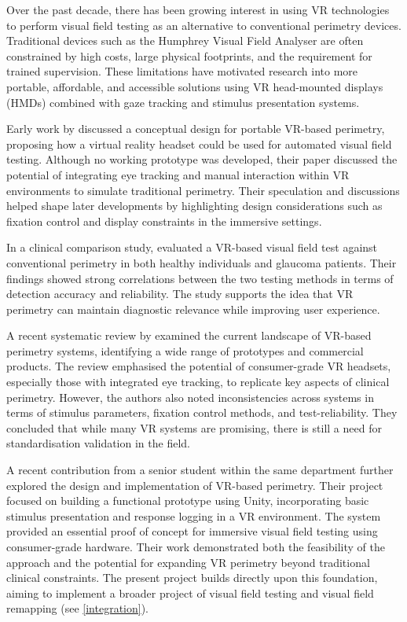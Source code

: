 \documentclass{l4proj}
\begin{document}
Over the past decade, there has been growing interest in using VR technologies to perform visual field testing as an alternative to conventional perimetry devices. Traditional devices such as the Humphrey Visual Field Analyser are often constrained by high costs, large physical footprints, and the requirement for trained supervision. These limitations have motivated research into more portable, affordable, and accessible solutions using VR head-mounted displays (HMDs) combined with gaze tracking and stimulus presentation systems.

Early work by \cite{pwork1} discussed a conceptual design for portable VR-based perimetry, proposing how a virtual reality headset could be used for automated visual field testing. Although no working prototype was developed, their paper discussed the potential of integrating eye tracking and manual interaction within VR environments to simulate traditional perimetry. Their speculation and discussions helped shape later developments by highlighting design considerations such as fixation control and display constraints in the immersive settings.

In a clinical comparison study, \cite{pwork2} evaluated a VR-based visual field test against conventional perimetry in both healthy individuals and glaucoma patients. Their findings showed strong correlations between the two testing methods in terms of detection accuracy and reliability. The study supports the idea that VR perimetry can maintain diagnostic relevance while improving user experience.

A recent systematic review by \cite{pwork3} examined the current landscape of VR-based perimetry systems, identifying a wide range of prototypes and commercial products. The review emphasised the potential of consumer-grade VR headsets, especially those with integrated eye tracking, to replicate key aspects of clinical perimetry. However, the authors also noted inconsistencies across systems in terms of stimulus parameters, fixation control methods, and test-reliability. They concluded that while many VR systems are promising, there is still a need for standardisation validation in the field.

A recent contribution from a senior student within the same department further explored the design and implementation of VR-based perimetry. Their project focused on building a functional prototype using Unity, incorporating basic stimulus presentation and response logging in a VR environment. The system provided an essential proof of concept for immersive visual field testing using consumer-grade hardware. Their work demonstrated both the feasibility of the approach and the potential for expanding VR perimetry beyond traditional clinical constraints. The present project builds directly upon this foundation, aiming to implement a broader project of visual field testing and visual field remapping (see \ref{integration}).
\end{document}
